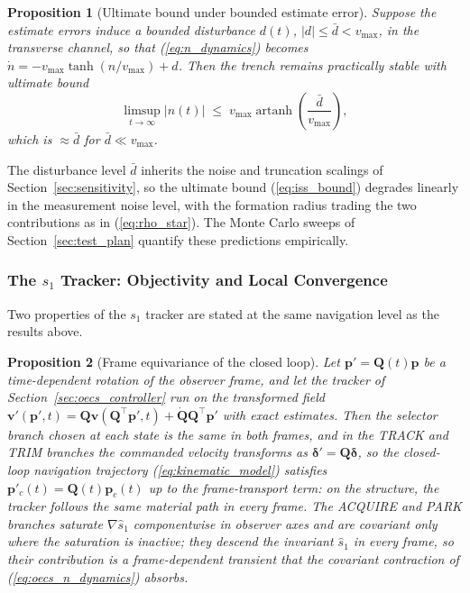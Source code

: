 \documentclass[lettersize,journal]{IEEEtran}
\newtheorem{proposition}{Proposition}
\begin{document}
\begin{proposition}[Ultimate bound under bounded estimate error]
\label{prop:iss}
Suppose the estimate errors induce a bounded disturbance $d(t)$, $|d|
\leq \bar{d} < v_{\max}$, in the transverse channel, so that
(\ref{eq:n_dynamics}) becomes $\dot{n} = -v_{\max}\tanh(n/v_{\max}) +
d$. Then the trench remains practically stable with ultimate bound
\begin{equation}
    \limsup_{t\to\infty} |n(t)| \;\leq\;
    v_{\max}\operatorname{artanh}\!\left(\frac{\bar{d}}{v_{\max}}\right),
    \label{eq:iss_bound}
\end{equation}
which is $\approx \bar{d}$ for $\bar{d} \ll v_{\max}$.
\end{proposition}

The disturbance level $\bar{d}$ inherits the noise and truncation
scalings of Section~\ref{sec:sensitivity}, so the ultimate bound
(\ref{eq:iss_bound}) degrades linearly in the measurement noise level,
with the formation radius trading the two contributions as in
(\ref{eq:rho_star}). The Monte Carlo sweeps of
Section~\ref{sec:test_plan} quantify these predictions empirically.

\subsubsection{The $s_1$ Tracker: Objectivity and Local Convergence}
\label{sec:stab_oecs}

Two properties of the $s_1$ tracker are stated at the same navigation
level as the results above.

\begin{proposition}[Frame equivariance of the closed loop]
\label{prop:equivariance}
Let $\mathbf{p}'= \mathbf{Q}(t)\mathbf{p}$ be a time-dependent rotation
of the observer frame, and let the tracker of
Section~\ref{sec:oecs_controller} run on the transformed field
$\mathbf{v}'(\mathbf{p}', t) = \mathbf{Q}\mathbf{v}(\mathbf{Q}^\top
\mathbf{p}', t) + \dot{\mathbf{Q}}\mathbf{Q}^\top\mathbf{p}'$ with
exact estimates. Then the selector branch chosen at each state is the
same in both frames, and in the TRACK and TRIM branches the commanded
velocity transforms as
$\boldsymbol{\delta}' = \mathbf{Q}\boldsymbol{\delta}$, so the
closed-loop navigation trajectory (\ref{eq:kinematic_model}) satisfies
$\mathbf{p}'_c(t) = \mathbf{Q}(t)\mathbf{p}_c(t)$ up to the
frame-transport term: on the structure, the tracker follows the same
material path in every frame. The ACQUIRE and PARK branches saturate
$\nabla\hat{s}_1$ componentwise in observer axes and are covariant only
where the saturation is inactive; they descend the invariant
$\hat{s}_1$ in every frame, so their contribution is a frame-dependent
transient that the covariant contraction of
(\ref{eq:oecs_n_dynamics}) absorbs.
\end{proposition}
\end{document}
